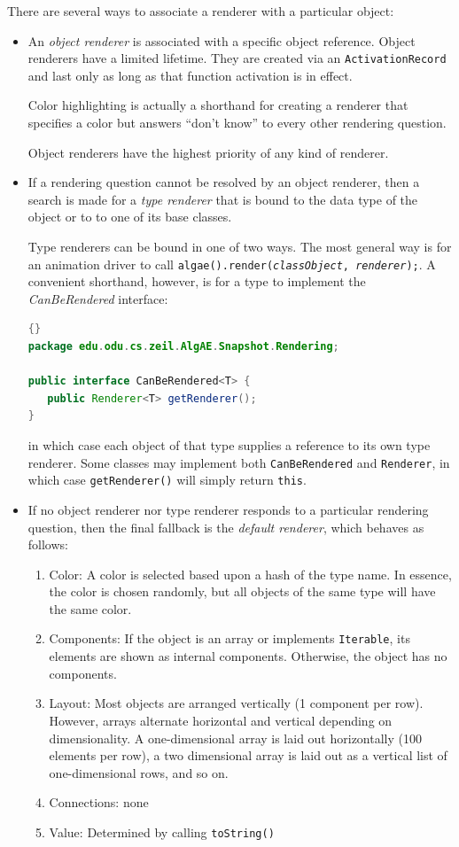 \documentclass[11pt,titlepage]{book}
\begin{document}
There are several ways to associate a renderer with a particular object:
\begin{itemize}
\item An {\em object renderer} is associated with a specific object reference. Object renderers have a limited lifetime. They are created via an \texttt{ActivationRecord} and last only as long as that function activation is in effect. 

Color highlighting is actually a shorthand for creating a renderer that specifies a color but answers ``don't know'' to every other rendering question.

Object renderers have the highest priority of any kind of renderer.

\item If a rendering question cannot be resolved by an object renderer, then a search is made for a {\em type renderer} that is bound to the data type of the object or to to one of its base classes.

Type renderers can be bound in one of two ways. The most general way is for an animation driver to call \texttt{algae().render({\em classObject}, {\em renderer});}. A convenient shorthand, however, is for a type to implement the {\em CanBeRendered} interface:
\begin{lstlisting}[language=Java,frame=tb]{}
package edu.odu.cs.zeil.AlgAE.Snapshot.Rendering;

public interface CanBeRendered<T> {
   public Renderer<T> getRenderer();
}
\end{lstlisting}

in which case each object of that type supplies a reference to its 
own type renderer.  Some classes may implement both \texttt{CanBeRendered} and \texttt{Renderer}, in which case \texttt{getRenderer()} will simply return \texttt{this}.

\item  If no object renderer nor type renderer responds to a 
  particular rendering question, then the final fallback is the 
  {\em default renderer}, which behaves as follows:
  \begin{enumerate}
  \item Color: A color is selected based upon a hash of the type name. In
    essence, the color is chosen randomly, but all objects of the same
    type will have the same color.
  \item Components: If the object is an array or implements
    \texttt{Iterable}, its elements are shown as internal
    components. Otherwise, the object has no components.
  \item Layout: Most objects are arranged vertically (1 component per
    row).  However, arrays alternate horizontal and vertical depending
    on dimensionality. A one-dimensional array is laid out
    horizontally (100 elements per row), a two dimensional array is
    laid out as a vertical list of one-dimensional rows, and so on.
  \item Connections: none
  \item Value: Determined by calling \texttt{toString()}


\end{enumerate}
\end{itemize}
\end{document}
